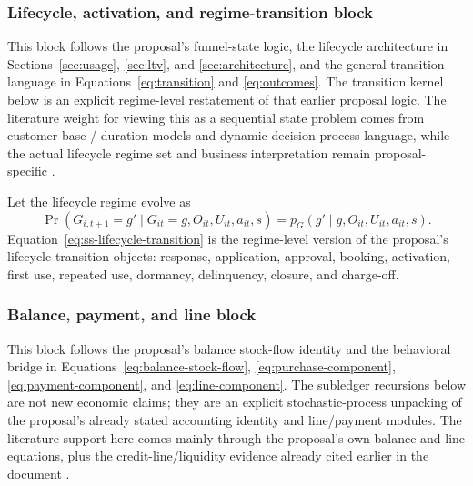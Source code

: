 \documentclass[11pt]{article}
\newcommand{\1}{\mathbf{1}}
\begin{document}
\subsubsection{Lifecycle, activation, and regime-transition block}
\label{subsec:state-space-lifecycle-block}

This block follows the proposal's funnel-state logic, the lifecycle
architecture in Sections~\ref{sec:usage}, \ref{sec:ltv}, and
\ref{sec:architecture}, and the general transition language in
Equations~\eqref{eq:transition} and \eqref{eq:outcomes}. The transition kernel
below is an explicit regime-level restatement of that earlier proposal logic.
The literature weight for viewing this as a sequential state problem comes from
customer-base / duration models and dynamic decision-process language, while the
actual lifecycle regime set and business interpretation remain proposal-specific
\citep{schmittlein1987counting,fader2005bgnbd,bolton1998duration,
puterman1994mdp,murphy2003dynamic}.

Let the lifecycle regime evolve as
\begin{equation}
  \Pr(G_{i,t+1}=g'\mid G_{it}=g,O_{it},U_{it},a_{it},s)
  = p_G(g'\mid g,O_{it},U_{it},a_{it},s).
  \label{eq:ss-lifecycle-transition}
\end{equation}
Equation~\eqref{eq:ss-lifecycle-transition} is the regime-level version of the
proposal's lifecycle transition objects: response, application, approval,
booking, activation, first use, repeated use, dormancy, delinquency, closure,
and charge-off.

\subsubsection{Balance, payment, and line block}
\label{subsec:state-space-balance-block}

This block follows the proposal's balance stock-flow identity and the
behavioral bridge in Equations~\eqref{eq:balance-stock-flow},
\eqref{eq:purchase-component}, \eqref{eq:payment-component}, and
\eqref{eq:line-component}. The subledger recursions below are not new economic
claims; they are an explicit stochastic-process unpacking of the proposal's
already stated accounting identity and line/payment modules. The literature
support here comes mainly through the proposal's own balance and line equations,
plus the credit-line/liquidity evidence already cited earlier in the document
\citep{gross2001liquidity}.
\end{document}
